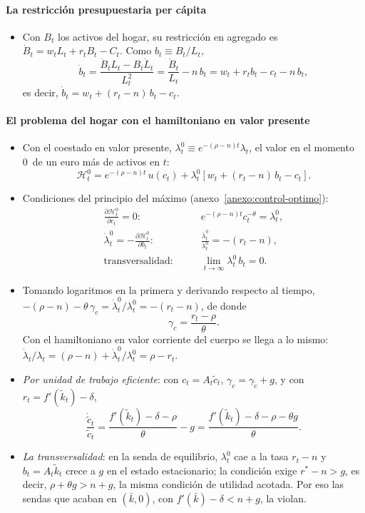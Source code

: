 \documentclass[11pt]{article}
\begin{document}
\paragraph{La restricción presupuestaria per cápita}

\begin{itemize}
\item Con $B_t$ los activos del hogar, su restricción en agregado es $\dot B_t=w_tL_t+r_tB_t-C_t$. Como $b_t\equiv B_t/L_t$,
  \[\dot b_t=\frac{\dot B_tL_t-B_t\dot L_t}{L_t^2}=\frac{\dot B_t}{L_t}-n\,b_t=w_t+r_tb_t-c_t-n\,b_t,\]
  es decir, $\dot b_t=w_t+(r_t-n)\,b_t-c_t$.
\end{itemize}

\paragraph{El problema del hogar con el hamiltoniano en valor presente}

\begin{itemize}
\item Con el coestado en valor presente, $\lambda^0_t\equiv e^{-(\rho-n)t}\lambda_t$, el valor en el momento 0~de un euro más de activos en $t$:
  \[\mathcal{H}^0_t=e^{-(\rho-n)t}\,u(c_t)+\lambda^0_t\left[w_t+(r_t-n)\,b_t-c_t\right].\]
\item Condiciones del principio del máximo (anexo~\ref{anexo:control-optimo}):
  \begin{align*}
  \frac{\partial\mathcal{H}^0_t}{\partial c_t}=0:&\qquad e^{-(\rho-n)t}c_t^{-\theta}=\lambda^0_t,\\
  \dot\lambda^0_t=-\frac{\partial\mathcal{H}^0_t}{\partial b_t}:&\qquad \frac{\dot\lambda^0_t}{\lambda^0_t}=-(r_t-n),\\
  \text{transversalidad}:&\qquad \lim_{t\to\infty}\lambda^0_t\,b_t=0.
  \end{align*}
\item Tomando logaritmos en la primera y derivando respecto al tiempo, $-(\rho-n)-\theta\,\gamma_c=\dot\lambda^0_t/\lambda^0_t=-(r_t-n)$, de donde
  \[\gamma_c=\frac{r_t-\rho}{\theta}.\]
  Con el hamiltoniano en valor corriente del cuerpo se llega a lo mismo: $\dot\lambda_t/\lambda_t=(\rho-n)+\dot\lambda^0_t/\lambda^0_t=\rho-r_t$.
\item \emph{Por unidad de trabajo eficiente}: con $c_t=A_t\tilde c_t$, $\gamma_c=\gamma_{\tilde c}+g$, y con $r_t=f'(\tilde k_t)-\delta$,
  \[\frac{\dot{\tilde c}_t}{\tilde c_t}=\frac{f'(\tilde k_t)-\delta-\rho}{\theta}-g=\frac{f'(\tilde k_t)-\delta-\rho-\theta g}{\theta}.\]
\item \emph{La transversalidad}: en la senda de equilibrio, $\lambda^0_t$ cae a la tasa $r_t-n$ y $b_t=A_t\tilde k_t$ crece a $g$ en el estado estacionario; la condición exige $r^*-n>g$, es decir, $\rho+\theta g>n+g$, la misma condición de utilidad acotada. Por eso las sendas que acaban en $(\bar k,0)$, con $f'(\bar k)-\delta<n+g$, la violan.
\end{itemize}
\end{document}

